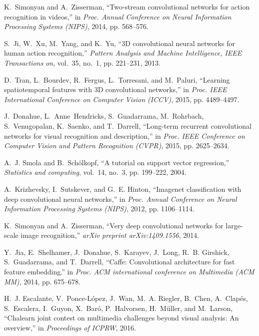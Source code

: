 \documentclass[10pt, a4paper, conference]{IEEEtran}
\begin{document}
\begin{thebibliography}{10}
K.~Simonyan and A.~Zisserman, ``Two-stream convolutional networks for action
  recognition in videos,'' in \emph{Proc. Annual Conference on Neural
  Information Processing Systems (NIPS)}, 2014, pp. 568--576.

S.~Ji, W.~Xu, M.~Yang, and K.~Yu, ``{3D} convolutional neural networks for
  human action recognition,'' \emph{Pattern Analysis and Machine Intelligence,
  IEEE Transactions on}, vol.~35, no.~1, pp. 221--231, 2013.

D.~Tran, L.~Bourdev, R.~Fergus, L.~Torresani, and M.~Paluri, ``Learning
  spatiotemporal features with {3D} convolutional networks,'' in \emph{Proc.
  IEEE International Conference on Computer Vision (ICCV)}, 2015, pp.
  4489--4497.

J.~Donahue, L.~Anne~Hendricks, S.~Guadarrama, M.~Rohrbach, S.~Venugopalan,
  K.~Saenko, and T.~Darrell, ``Long-term recurrent convolutional networks for
  visual recognition and description,'' in \emph{Proc. IEEE Conference on
  Computer Vision and Pattern Recognition (CVPR)}, 2015, pp. 2625--2634.

A.~J. Smola and B.~Sch{\"o}lkopf, ``A tutorial on support vector regression,''
  \emph{Statistics and computing}, vol.~14, no.~3, pp. 199--222, 2004.

A.~Krizhevsky, I.~Sutskever, and G.~E. Hinton, ``Imagenet classification with
  deep convolutional neural networks,'' in \emph{Proc. Annual Conference on
  Neural Information Processing Systems (NIPS)}, 2012, pp. 1106--1114.

K.~Simonyan and A.~Zisserman, ``Very deep convolutional networks for
  large-scale image recognition,'' \emph{arXiv preprint arXiv:1409.1556}, 2014.

Y.~Jia, E.~Shelhamer, J.~Donahue, S.~Karayev, J.~Long, R.~B. Girshick,
  S.~Guadarrama, and T.~Darrell, ``Caffe: Convolutional architecture for fast
  feature embedding.'' in \emph{Proc. ACM international conference on
  Multimedia (ACM MM)}, 2014, pp. 675--678.

H.~J. Escalante, V.~Ponce-López, J.~Wan, M.~A. Riegler, B.~Chen, A.~Clapés,
  S.~Escalera, I.~Guyon, X.~Baró, P.~Halvorsen, H.~Müller, and M.~Larson,
  ``Chalearn joint contest on multimedia challenges beyond visual analysis: An
  overview,'' in \emph{Proceedings of ICPRW}, 2016.


\end{thebibliography}
\end{document}
